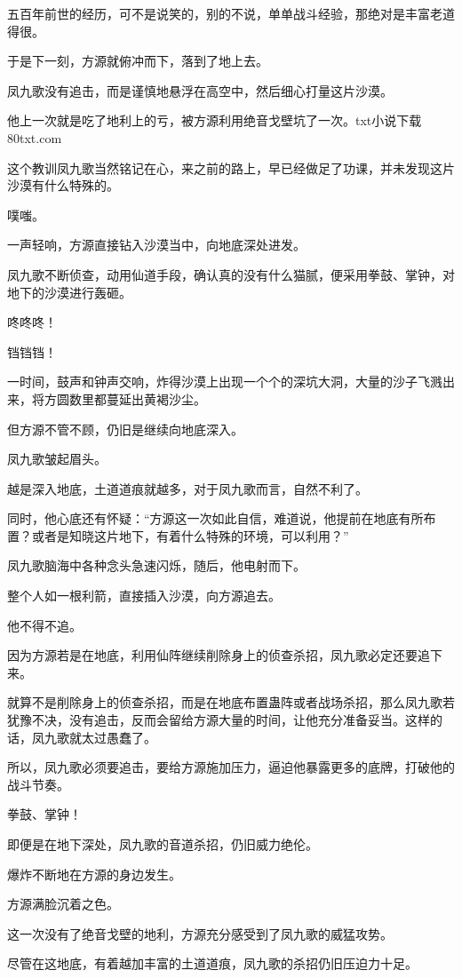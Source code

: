 \begin{this_body}
五百年前世的经历，可不是说笑的，别的不说，单单战斗经验，那绝对是丰富老道得很。

于是下一刻，方源就俯冲而下，落到了地上去。

凤九歌没有追击，而是谨慎地悬浮在高空中，然后细心打量这片沙漠。

他上一次就是吃了地利上的亏，被方源利用绝音戈壁坑了一次。txt小说下载80txt.com

这个教训凤九歌当然铭记在心，来之前的路上，早已经做足了功课，并未发现这片沙漠有什么特殊的。

噗嗤。

一声轻响，方源直接钻入沙漠当中，向地底深处进发。

凤九歌不断侦查，动用仙道手段，确认真的没有什么猫腻，便采用拳鼓、掌钟，对地下的沙漠进行轰砸。

咚咚咚！

铛铛铛！

一时间，鼓声和钟声交响，炸得沙漠上出现一个个的深坑大洞，大量的沙子飞溅出来，将方圆数里都蔓延出黄褐沙尘。

但方源不管不顾，仍旧是继续向地底深入。

凤九歌皱起眉头。

越是深入地底，土道道痕就越多，对于凤九歌而言，自然不利了。

同时，他心底还有怀疑：“方源这一次如此自信，难道说，他提前在地底有所布置？或者是知晓这片地下，有着什么特殊的环境，可以利用？”

凤九歌脑海中各种念头急速闪烁，随后，他电射而下。

整个人如一根利箭，直接插入沙漠，向方源追去。

他不得不追。

因为方源若是在地底，利用仙阵继续削除身上的侦查杀招，凤九歌必定还要追下来。

就算不是削除身上的侦查杀招，而是在地底布置蛊阵或者战场杀招，那么凤九歌若犹豫不决，没有追击，反而会留给方源大量的时间，让他充分准备妥当。这样的话，凤九歌就太过愚蠢了。

所以，凤九歌必须要追击，要给方源施加压力，逼迫他暴露更多的底牌，打破他的战斗节奏。

拳鼓、掌钟！

即便是在地下深处，凤九歌的音道杀招，仍旧威力绝伦。

爆炸不断地在方源的身边发生。

方源满脸沉着之色。

这一次没有了绝音戈壁的地利，方源充分感受到了凤九歌的威猛攻势。

尽管在这地底，有着越加丰富的土道道痕，凤九歌的杀招仍旧压迫力十足。


\end{this_body}
